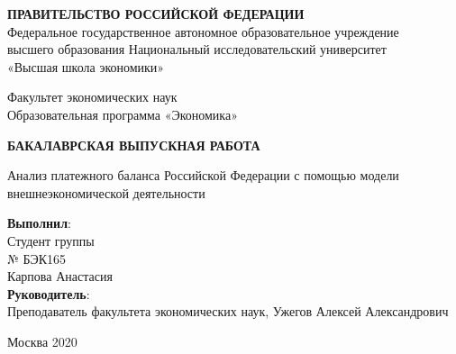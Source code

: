 \documentclass[a4paper, 14pt]{extarticle}
\begin{document}
\begin{center}
	\textbf{ПРАВИТЕЛЬСТВО РОССИЙСКОЙ ФЕДЕРАЦИИ}\\

	Федеральное государственное автономное образовательное учреждение\\ высшего образования Национальный исследовательский университет \\ «Высшая школа экономики»


	\vspace{2ex}

		Факультет экономических наук\\
		Образовательная программа «Экономика»
\end{center}

\vspace{4ex}

\begin{center}
	{\textbf{БАКАЛАВРСКАЯ ВЫПУСКНАЯ РАБОТА
	}}

	
	Анализ платежного баланса Российской Федерации с помощью модели внешнеэкономической деятельности
\end{center}
\vspace{15ex}

\begin{minipage}{.35\linewidth}

\end{minipage}
\hfill
\begin{minipage}{.35\linewidth}
	\begin{flushleft}
		\noindent
\textbf{Выполнил}:\\
	Студент группы\\
	№ БЭК165\\
	Карпова Анастасия\\
	\vspace{2ex}
\textbf{Руководитель}:\\
	Преподаватель факультета экономических наук,
	Ужегов Алексей Александрович\\
	\end{flushleft} 
\end{minipage}

\begin{center}
	\vspace{5ex}
	Москва 2020
\thispagestyle{empty}
\end{center}

\setcounter{secnumdepth}{-2} %
\newpage
\lhead{\eye}

\thispagestyle{fancyplain}
\tableofcontents
\end{document}
